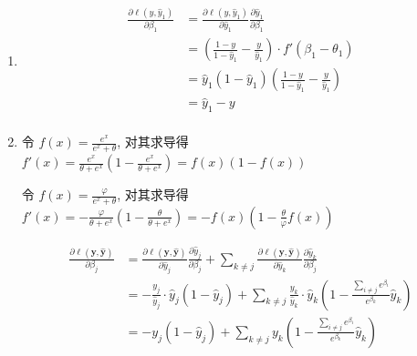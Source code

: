 \documentclass[answers]{exam}  %
\begin{document}
\begin{questions}
\begin{enumerate}
  \end{enumerate}


  \begin{solution}
    \begin{enumerate}
      \item

            $$
              \begin{aligned}
                \frac{\partial \ell(y, \hat{y}_1)}{\partial \beta_1}
                 & = \frac{\partial \ell(y, \hat{y}_1)}{\partial \hat{y}_1}\frac{\partial \hat{y}_1}{\partial \beta_1} \\
                 & = (\frac{1-y}{1-\hat{y}_1} - \frac{y}{\hat{y}_1}) \cdot f'(\beta_1 - \theta_1)                      \\
                 & = \hat{y}_1(1-\hat{y}_1)(\frac{1-y}{1-\hat{y}_1} - \frac{y}{\hat{y}_1})                             \\
                 & = \hat{y}_1 - y                                                                                     \\
              \end{aligned}
            $$

      \item

            令 $\displaystyle f(x) = \frac{e^{x}}{e^{x} + \theta}$, 对其求导得 $\displaystyle f'(x) = \frac{e^{x}}{\theta + e^{x}}(1 - \frac{e^{x}}{\theta + e^{x}}) = f(x)(1-f(x))$

            令 $\displaystyle f(x) = \frac{\varphi}{e^{x} + \theta}$, 对其求导得 $\displaystyle f'(x) = - \frac{\varphi}{\theta + e^{x}}(1 - \frac{\theta}{\theta + e^{x}}) = -f(x)(1 - \frac{\theta}{\varphi}f(x))$

            $$
            \begin{aligned}
              \frac{\partial \ell(\bm{y}, \hat{\bm{y}})}{\partial \beta_j}
              & = \frac{\partial \ell(\bm{y}, \hat{\bm{y}})}{\partial \hat{y}_j}\frac{\partial \hat{y}_j}{\partial \beta_j} + \sum_{k \neq j}\frac{\partial \ell(\bm{y}, \hat{\bm{y}})}{\partial \hat{y}_k}\frac{\partial \hat{y}_k}{\partial \beta_j} \\
              & = -\frac{y_j}{\hat{y}_j} \cdot \hat{y}_j(1 - \hat{y}_j) + \sum_{k \neq j} \frac{y_k}{\hat{y}_k} \cdot \hat{y}_k(1 - \frac{\sum_{i \neq j}e^{\beta_i}}{e^{\beta_k}}\hat{y}_k) \\
              & = -y_{j} (1 - \hat{y}_j) + \sum_{k \neq j} y_{k}(1 - \frac{\sum_{i \neq j}e^{\beta_i}}{e^{\beta_k}}\hat{y}_k) \\
              \end{aligned}
            $$


\end{enumerate}
\end{solution}
\end{questions}
\end{document}
